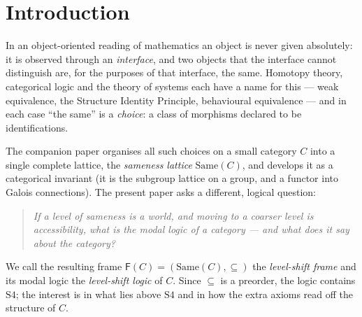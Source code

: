 \documentclass[11pt]{amsart}
\theoremstyle{definition}
\newcommand{\Same}{\mathrm{Same}}
\newcommand{\Fr}{\mathsf{F}}
\begin{document}
\maketitle

\section{Introduction}

In an object-oriented reading of mathematics an object is never given
absolutely: it is observed through an \emph{interface}, and two objects that
the interface cannot distinguish are, for the purposes of that interface, the
same. Homotopy theory, categorical logic and the theory of systems each have a
name for this --- weak equivalence, the Structure Identity Principle, behavioural
equivalence --- and in each case ``the same'' is a \emph{choice}: a class of
morphisms declared to be identifications.

The companion paper \cite{SameA} organises all such choices on a small category
$C$ into a single complete lattice, the \emph{sameness lattice} $\Same(C)$, and
develops it as a categorical invariant (it is the subgroup lattice on a group,
and a functor into Galois connections). The present paper asks a different,
logical question:

\begin{quote}
\emph{If a level of sameness is a world, and moving to a coarser level is
accessibility, what is the modal logic of a category --- and what does it say
about the category?}
\end{quote}

We call the resulting frame $\Fr(C)=(\Same(C),\subseteq)$ the \emph{level-shift
frame} and its modal logic the \emph{level-shift logic} of $C$. Since
$\subseteq$ is a preorder, the logic contains $\mathrm{S4}$; the interest is in
what lies above $\mathrm{S4}$ and in how the extra axioms read off the
structure of $C$.
\end{document}
